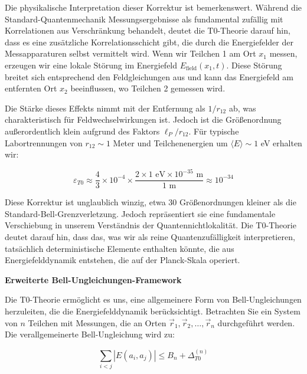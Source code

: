 \documentclass[12pt,a4paper]{article}
\theoremstyle{definition}
\theoremstyle{remark}
\begin{document}
Die physikalische Interpretation dieser Korrektur ist bemerkenswert. W{\"a}hrend die Standard-Quantenmechanik Messungsergebnisse als fundamental zuf{\"a}llig mit Korrelationen aus Verschr{\"a}nkung behandelt, deutet die T0-Theorie darauf hin, dass es eine zus{\"a}tzliche Korrelationsschicht gibt, die durch die Energiefelder der Messapparaturen selbst vermittelt wird. Wenn wir Teilchen 1 am Ort $x_1$ messen, erzeugen wir eine lokale St{\"o}rung im Energiefeld $E_{\text{field}}(x_1, t)$. Diese St{\"o}rung breitet sich entsprechend den Feldgleichungen aus und kann das Energiefeld am entfernten Ort $x_2$ beeinflussen, wo Teilchen 2 gemessen wird.

Die St{\"a}rke dieses Effekts nimmt mit der Entfernung als $1/r_{12}$ ab, was charakteristisch f{\"u}r Feldwechselwirkungen ist. Jedoch ist die Gr{\"o}{\ss}enordnung au{\ss}erordentlich klein aufgrund des Faktors $\ell_P/r_{12}$. F{\"u}r typische Labortrennungen von $r_{12} \sim 1$ Meter und Teilchenenergien um $\langle E \rangle \sim 1$ eV erhalten wir:

\begin{equation}
	\varepsilon_{T0} \approx \frac{4}{3} \times 10^{-4} \times \frac{2 \times 1 \text{ eV} \times 10^{-35} \text{ m}}{1 \text{ m}} \approx 10^{-34}
\end{equation}

Diese Korrektur ist unglaublich winzig, etwa 30 Gr{\"o}{\ss}enordnungen kleiner als die Standard-Bell-Grenzverletzung. Jedoch repr{\"a}sentiert sie eine fundamentale Verschiebung in unserem Verst{\"a}ndnis der Quantennichtlokalit{\"a}t. Die T0-Theorie deutet darauf hin, dass das, was wir als reine Quantenzuf{\"a}lligkeit interpretieren, tats{\"a}chlich deterministische Elemente enthalten k{\"o}nnte, die aus Energiefelddynamik entstehen, die auf der Planck-Skala operiert.

\textbf{Erweiterte Bell-Ungleichungen-Framework}

Die T0-Theorie erm{\"o}glicht es uns, eine allgemeinere Form von Bell-Ungleichungen herzuleiten, die die Energiefelddynamik ber{\"u}cksichtigt. Betrachten Sie ein System von $n$ Teilchen mit Messungen, die an Orten $\vec{r}_1, \vec{r}_2, \ldots, \vec{r}_n$ durchgef{\"u}hrt werden. Die verallgemeinerte Bell-Ungleichung wird zu:

\begin{equation}
	\boxed{\sum_{i<j} |E(a_i, a_j)| \leq B_n + \Delta_{T0}^{(n)}}
	\label{eq:extended_bell}
\end{equation}
\end{document}

